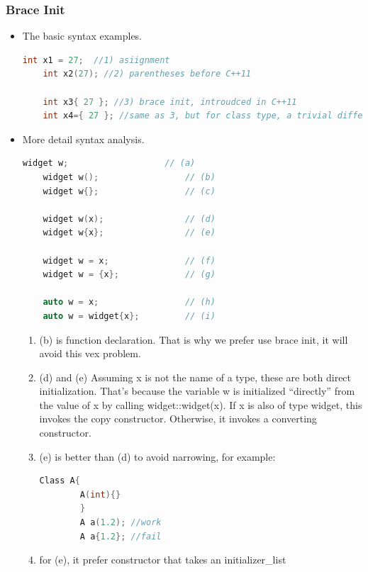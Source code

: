 \documentclass[a4paper,12pt,twoside]{book}
\begin{document}
\subsubsection{Brace Init}

\begin{itemize}
	
	\item The basic syntax examples. 
	\begin{lstlisting}[frame=single, language=c++,mathescape=true]
	int x1 = 27;  //1) asiignment
	int x2(27); //2) parentheses before C++11
	
	int x3{ 27 }; //3) brace init, introudced in C++11
	int x4={ 27 }; //same as 3, but for class type, a trivial difference. can't use it with explicit copy ctor( introduced before)
	\end{lstlisting}
	
	
	\item More detail syntax analysis.
	\begin{lstlisting}[frame=single, language=c++,mathescape=true]
	widget w;                   // (a)
	widget w();                 // (b)
	widget w{};                 // (c)
	
	widget w(x);                // (d)
	widget w{x};                // (e)
	
	widget w = x;               // (f)
	widget w = {x};             // (g)
	
	auto w = x;                 // (h)
	auto w = widget{x};         // (i)
	\end{lstlisting}
	
	\begin{enumerate}
		\item (b) is function declaration. That is why we prefer use brace init, it will avoid this vex problem.
		\item (d) and (e) Assuming x is not the name of a type, these are both direct initialization. That’s because the variable w is initialized “directly” from the value of x by calling widget::widget(x). If x is also of type widget, this invokes the copy constructor. Otherwise, it invokes a converting constructor.
		\item (e) is better than (d) to avoid narrowing, for example:
		\begin{lstlisting}[frame=single, language=c++,mathescape=true]
		Class A{
		A(int){}
		}
		A a(1.2); //work
		A a{1.2}; //fail
		\end{lstlisting}
		\item for (e), it prefer constructor that takes an initializer\_list
		

\end{enumerate}
\end{itemize}
\end{document}
